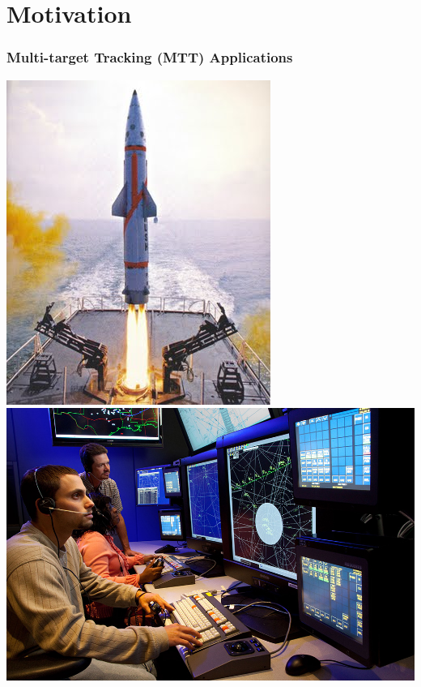 \documentclass{beamer}
\begin{document}
\section{Motivation}
\begin{frame}
\frametitle{Multi-target Tracking (MTT) Applications}
\includegraphics[width=\textwidth,height=0.4\textheight,keepaspectratio]{ballistic_missile.jpg}
\includegraphics[width=\textwidth,height=0.4\textheight,keepaspectratio]{ATC.jpg}

\end{frame}
\end{document}
